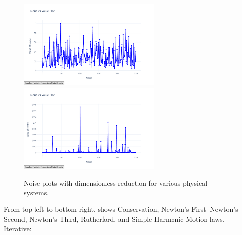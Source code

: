 \documentclass{article}
\begin{document}
\begin{figure}[H]
    \includegraphics[width=7cm]{noise_Rutherford_d_r}
    \includegraphics[width=7cm]{noise_Simple_Harmonic_Motion_d_r}
    \caption{Noise plots with dimensionless reduction for various physical systems.}
    \label{fig:noise_dimless_plots}
\end{figure}

From top left to bottom right, shows Conservation, Newton's First, Newton's Second, Newton's Third, Rutherford, and Simple Harmonic Motion laws.\\  


Iterative: \\
\end{document}
